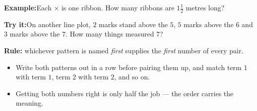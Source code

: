\documentclass[12pt]{article}
\begin{document}
\begin{examplebox}
\textbf{Example:}\quad Each $\times$ is one ribbon. How many ribbons are
$1\tfrac{1}{2}$ metres long?
\par\vspace{2pt}
\begin{center}
\end{center}
\end{examplebox}

\begin{tryitbox}
\textbf{Try it:}\quad On another line plot, $2$ marks stand above the $5$, $5$
marks above the $6$ and $3$ marks above the $7$. How many things measured
$7$?\\[2pt]
\end{tryitbox}


\begin{formulabox}
\textbf{Rule:} whichever pattern is named \emph{first} supplies the
\emph{first} number of every pair.
\begin{itemize}[leftmargin=0.8cm, itemsep=1pt, topsep=2pt]
  \item Write both patterns out in a row before pairing them up, and match term
        $1$ with term $1$, term $2$ with term $2$, and so on.
  \item Getting both numbers right is only half the job --- the order carries
        the meaning.
\end{itemize}
\end{formulabox}
\end{document}
